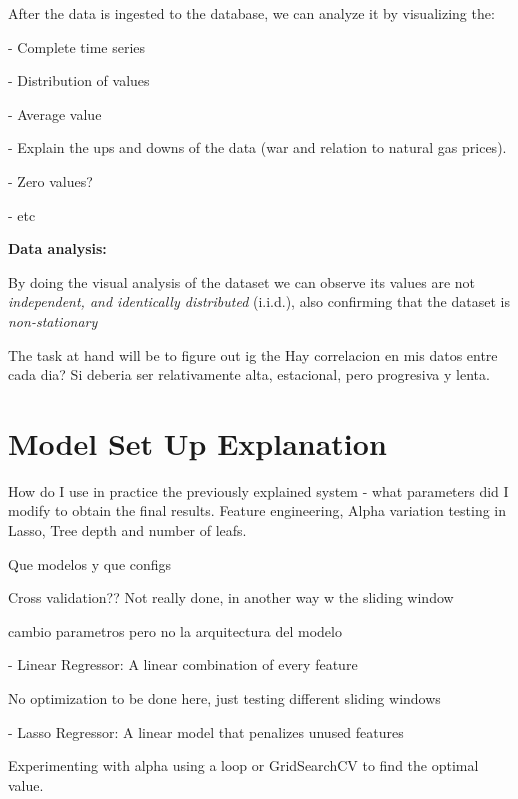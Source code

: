 \documentclass[12pt]{report} %
\begin{document}

After the data is ingested to the database, we can analyze it by visualizing the:

- Complete time series

- Distribution of values

- Average value

- Explain the ups and downs of the data (war and relation to natural gas prices).

- Zero values?

- etc

\noindent \textbf{Data analysis:}

By doing the visual analysis of the dataset we can observe its values are not \textit{independent, and identically distributed} (i.i.d.), also confirming that the dataset is \textit{non-stationary}

The task at hand will be to figure out ig the
Hay correlacion en mis datos entre cada dia? Si deberia ser relativamente alta, estacional, pero progresiva y lenta.


\section{Model Set Up Explanation}
How do I use in practice the previously explained system - what parameters did I modify to obtain the final results. Feature engineering, Alpha variation testing in Lasso, Tree depth and number of leafs.

Que modelos y que configs

Cross validation?? Not really done, in another way w the sliding window

cambio parametros pero no la arquitectura del modelo



- Linear Regressor: A linear combination of every feature

No optimization to be done here, just testing different sliding windows

- Lasso Regressor: A linear model that penalizes unused features

Experimenting with alpha using a loop or GridSearchCV to find the optimal value.
\end{document}
